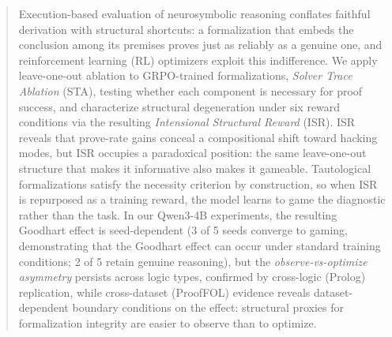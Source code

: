 \begin{abstract}
Execution-based evaluation of neurosymbolic reasoning conflates faithful derivation with structural shortcuts: a formalization that embeds the conclusion among its premises proves just as reliably as a genuine one, and reinforcement learning (RL) optimizers exploit this indifference.
We apply leave-one-out ablation to GRPO-trained formalizations, \emph{Solver Trace Ablation} (STA), testing whether each component is necessary for proof success, and characterize structural degeneration under six reward conditions via the resulting \emph{Intensional Structural Reward} (ISR).
ISR reveals that prove-rate gains conceal a compositional shift toward hacking modes, but ISR occupies a paradoxical position: the same leave-one-out structure that makes it informative also makes it gameable.
Tautological formalizations satisfy the necessity criterion by construction, so when ISR is repurposed as a training reward, the model learns to game the diagnostic rather than the task.
In our Qwen3-4B experiments, the resulting Goodhart effect is seed-dependent (3 of 5 seeds converge to gaming, demonstrating that the Goodhart effect can occur under standard training conditions; 2 of 5 retain genuine reasoning), but the \emph{observe-vs-optimize asymmetry} persists across logic types, confirmed by cross-logic (Prolog) replication, while cross-dataset (ProofFOL) evidence reveals dataset-dependent boundary conditions on the effect: structural proxies for formalization integrity are easier to observe than to optimize.\end{abstract}
